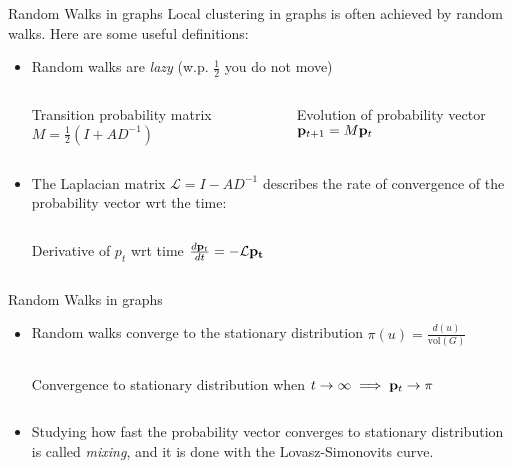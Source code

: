 \documentclass[../main.tex]{subfiles}
\begin{document}
    \begin{frame}{Random Walks in graphs}
        Local clustering in graphs is often achieved by random walks. Here are some useful definitions:
        \begin{itemize}
            \item Random walks are \textit{lazy} (w.p. $\frac{1}{2}$ you do not move)
            
            \begin{columns}
                \begin{block}{Transition probability matrix}
                    $M = \frac{1}{2}(I + AD^{-1})$ 
                \end{block}
                \begin{block}{Evolution of probability vector}
                    $\bold{p}_{t+1} = M \bold{p}_t$
                \end{block}
            \end{columns}
            \item The Laplacian matrix $\mathcal{L}=I - AD^{-1}$ describes the rate of convergence of the probability vector wrt the time:
            \begin{columns}
                \begin{block}{Derivative of $p_t$ wrt time}
                    $\frac{d \bold{p}_t}{d t} = - \mathcal{L} \bold{p_t}$
                \end{block}
            \end{columns}
        \end{itemize}
    \end{frame}
    
    
    \begin{frame}{Random Walks in graphs}
        \begin{itemize}
            \item Random walks converge to the stationary distribution $\pi(u) = \frac{d(u)}{\text{vol}(G)}$
                \begin{columns}
                    \begin{block}{Convergence to stationary distribution}
                        when $t\to\infty \implies \bold{p}_t\to \pi$
                    \end{block}
                \end{columns}
            \item Studying how fast the probability vector converges to stationary distribution is called \textit{mixing}, and it is done with the Lovasz-Simonovits curve.
        \end{itemize}
        
    \end{frame}
    
\end{document}
